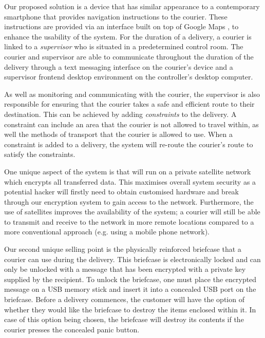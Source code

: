 

Our proposed solution is a device that has similar appearance to a contemporary smartphone that provides navigation instructions to the courier. These instructions are provided via an interface built on top of Google Maps \cite{GoogleMaps}, to enhance the usability of the system. For the duration of a delivery, a courier is linked to a \textit{supervisor} who is situated in a predetermined control room. The courier and supervisor are able to communicate throughout the duration of the delivery through a text messaging interface on the courier’s device and a supervisor frontend desktop environment on the controller’s desktop computer.

As well as monitoring and communicating with the courier, the supervisor is also responsible for ensuring that the courier takes a safe and efficient route to their destination. This can be achieved by adding \textit{constraints} to the delivery. A constraint can include an area that the courier is not allowed to travel within, as well the methods of transport that the courier is allowed to use. When a constraint is added to a delivery, the system will re-route the courier's route to satisfy the constraints.

One unique aspect of the system is that will run on a private satellite network which encrypts all transferred data. This maximises overall system security as a potential hacker will firstly need to obtain customised hardware and break through our encryption system to gain access to the network. Furthermore, the use of satellites improves the availability of the system; a courier will still be able to transmit and receive to the network in more remote locations compared to a more conventional approach (e.g. using a mobile phone network).

Our second unique selling point is the physically reinforced briefcase that a courier can use during the delivery. This briefcase is electronically locked and can only be unlocked with a message that has been encrypted with a private key supplied by the recipient. To unlock the briefcase, one must place the encrypted message on a USB memory stick and insert it into a concealed USB port on the briefcase. Before a delivery commences, the customer will have the option of whether they would like the briefcase to destroy the items enclosed within it. In case of this option being chosen, the briefcase will destroy its contents if the courier presses the concealed panic button.


